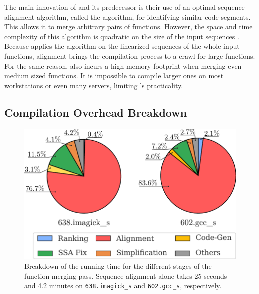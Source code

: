  The main innovation of \SOAName and its predecessor is their use of an optimal sequence alignment algorithm, called the \NW algorithm, for identifying similar code segments.
 This allows it to merge arbitrary pairs of functions.
 However, the space and time complexity of this algorithm is quadratic on the size of the input sequences \cite{needleman70,carrillo88}. Because \SOAName applies the algorithm on the linearized sequences of the whole input functions, alignment brings the compilation process to a crawl for large functions. For the same reason, \SOAName also incurs a high memory footprint when merging even medium sized functions. It is impossible to compile larger ones on most workstations or even many servers, limiting {\SOAName}'s practicality.

\subsection{Compilation Overhead Breakdown} \label{sec:motivation:breakdown}


\begin{figure}[t!]
  \centering
  \includegraphics[width=0.85\linewidth]{figs/compilation-breakdown-motivation-alignment.pdf}
  \caption{Breakdown of the running time for the different stages of the function merging pass. Sequence alignment alone takes 25 seconds and 4.2 minutes on \texttt{638.imagick\_s} and \texttt{602.gcc\_s}, respectively.}
  \label{fig:compilation-breakdown-motivation-alignment}
\end{figure}


